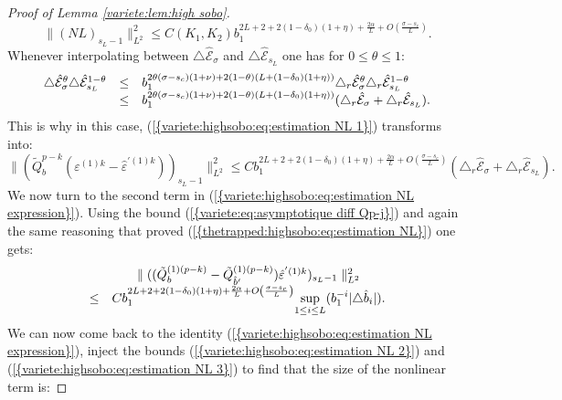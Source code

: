 \documentclass[11pt,a4paper,reqno]{amsart}
\theoremstyle{remark}
\numberwithin{equation}{section}
\begin{document}
\begin{proof}[Proof of Lemma \ref{variete:lem:high sobo}]
\begin{equation} \label{variete:highsobo:eq:estimation NL 1}
\parallel (NL)_{s_L-1}\parallel_{L^2}^2\leq C(K_1,K_2) b_1^{2L+2+2(1-\delta_0)(1+\eta)+\frac{2\alpha}{L}+O\left(\frac{\sigma-s_c}{L} \right)}.
\end{equation}
Whenever interpolating between $\triangle \hat{\mathcal{E}}_{\sigma} $ and $\triangle \hat{\mathcal{E}}_{s_L}$ one has for $0\leq \theta\leq 1$:
$$
\begin{array}{r c l}
\triangle \hat{\mathcal{E}}_{\sigma} ^{\theta} \triangle \hat{\mathcal{E}}_{s_L}^{1-\theta}&\leq &b_1^{2\theta(\sigma-s_c)(1+\nu)+2(1-\theta)(L+(1-\delta_0)(1+\eta))}\triangle _r\hat{\mathcal{E}}_{\sigma} ^{\theta} \triangle_r \hat{\mathcal{E}}_{s_L}^{1-\theta}\\
&\leq& b_1^{2\theta(\sigma-s_c)(1+\nu)+2(1-\theta)(L+(1-\delta_0)(1+\eta))}(\triangle _r\hat{\mathcal{E}}_{\sigma}+\triangle_r \hat{\mathcal{E}}_{s_L}).
\end{array}
$$
This is why in this case, {{\rm (\ref{{variete:highsobo:eq:estimation NL 1}})}} transforms into:
\begin{equation} \label{variete:highsobo:eq:estimation NL 2}
\parallel (\tilde{Q}_b^{p-k}(\varepsilon^{(1)k}-\hat{\varepsilon}^{'(1)k}))_{s_L-1}\parallel_{L^2}^2\leq Cb_1^{2L+2+2(1-\delta_0)(1+\eta)+\frac{2\alpha}{L}+O\left(\frac{\sigma-s_c}{L} \right)}(\triangle _r\hat{\mathcal{E}}_{\sigma}+\triangle_r \hat{\mathcal{E}}_{s_L}).
\end{equation}
We now turn to the second term in {{\rm (\ref{{variete:highsobo:eq:estimation NL expression}})}}. Using the bound {{\rm (\ref{{variete:eq:asymptotique diff Qp-j}})}} and again the same reasoning that proved  {{\rm (\ref{{thetrapped:highsobo:eq:estimation NL}})}} one gets:
\begin{equation} \label{variete:highsobo:eq:estimation NL 3}
\begin{array}{r c l}
&\parallel ((\tilde{Q}_b^{(1)(p-k)}-\tilde{Q}_{\hat{b}'}^{(1)(p-k)})\hat{\varepsilon}^{'(1)k})_{s_L-1}\parallel_{L^2}^2\\
\leq &Cb_1^{2L+2+2(1-\delta_0)(1+\eta)+\frac{2\alpha}{L}+O\left(\frac{\sigma-s_c}{L} \right)}\underset{1\leq i \leq L}{\text{sup}}(b_1^{-i}|\triangle \hat{b}_i|).
\end{array}
\end{equation}
We can now come back to the identity {{\rm (\ref{{variete:highsobo:eq:estimation NL expression}})}}, inject the bounds {{\rm (\ref{{variete:highsobo:eq:estimation NL 2}})}} and {{\rm (\ref{{variete:highsobo:eq:estimation NL 3}})}} to find that the size of the nonlinear term is:

\end{proof}
\end{document}
